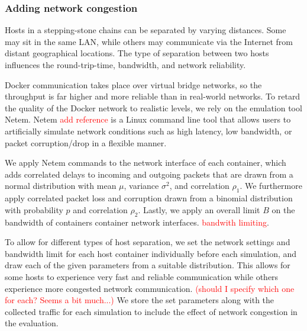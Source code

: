 \documentclass[conference]{IEEEtran}\usepackage[]{graphicx}\usepackage[]{color}
\begin{document}
\subsubsection{Adding network congestion}\label{Sec:congestion}

Hosts in a stepping-stone chains can be separated by varying distances. Some may sit in the same LAN, while others may communicate via the Internet from distant geographical locations. The type of separation between two hosts influences the round-trip-time, bandwidth, and network reliability. 

Docker communication takes place over virtual bridge networks, so the throughput is far higher and more reliable than in real-world networks. %
To retard the quality of the Docker network to realistic levels, we rely on the emulation tool Netem. Netem \textcolor{red}{add reference} is a Linux command line tool that allows users to artificially simulate network conditions such as high latency, low bandwidth, or packet corruption/drop in a flexible manner.

We apply Netem commands to the network interface of each container, which adds correlated delays to incoming and outgoing packets that are drawn from a normal distribution with mean $\mu$, variance $\sigma^2$, and correlation $\rho_1$. We furthermore apply correlated packet loss and corruption drawn from a binomial distribution with probability $p$ and correlation $\rho_2$. Lastly, we apply an overall limit $B$ on the bandwidth of containers container network interfaces.
 \textcolor{red}{bandwith limiting}.

To allow for different types of host separation, we set the network settings and bandwidth limit for each host container individually before each simulation, and draw each of the given parameters from a suitable distribution. This allows for some hosts to experience very fast and reliable communication while others experience more congested network communication.  \textcolor{red}{(should I specify which one for each? Seems a bit much...)} %
We store the set parameters along with the collected traffic for each simulation to include the effect of network congestion in the evaluation. 

\end{document}
